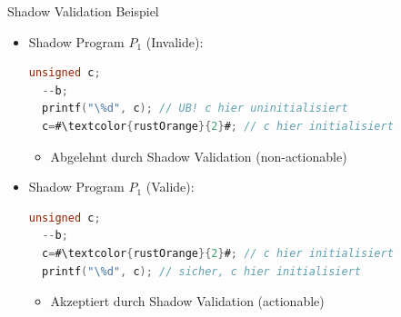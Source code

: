 ﻿\documentclass{beamer}
\begin{document}
\begin{frame}[fragile]{Shadow Validation Beispiel}
  \begin{itemize}
        \begin{lstlisting}[language=C,firstnumber=3,basicstyle=\ttfamily\tiny,escapechar=\#]
  unsigned c;
  --b;
  c=#\textcolor{rustOrange}{2}#; // c hier initialisiert
        \end{lstlisting}
    \item Shadow Program $P_1$ (Invalide):
        \begin{lstlisting}[language=C,firstnumber=3,basicstyle=\ttfamily\tiny,escapechar=\#]
  unsigned c;
  --b;
  printf("\%d", c); // UB! c hier uninitialisiert
  c=#\textcolor{rustOrange}{2}#; // c hier initialisiert
        \end{lstlisting}
        \begin{itemize}
          \item Abgelehnt durch Shadow Validation (non-actionable)
        \end{itemize}
    \item Shadow Program $P_1$ (Valide):
        \begin{lstlisting}[language=C,firstnumber=3,basicstyle=\ttfamily\tiny,escapechar=\#]
  unsigned c;
  --b;
  c=#\textcolor{rustOrange}{2}#; // c hier initialisiert
  printf("\%d", c); // sicher, c hier initialisiert
        \end{lstlisting}
        \begin{itemize}
          \item Akzeptiert durch Shadow Validation (actionable)
        \end{itemize}
  \end{itemize}
\end{frame}
\end{document}
